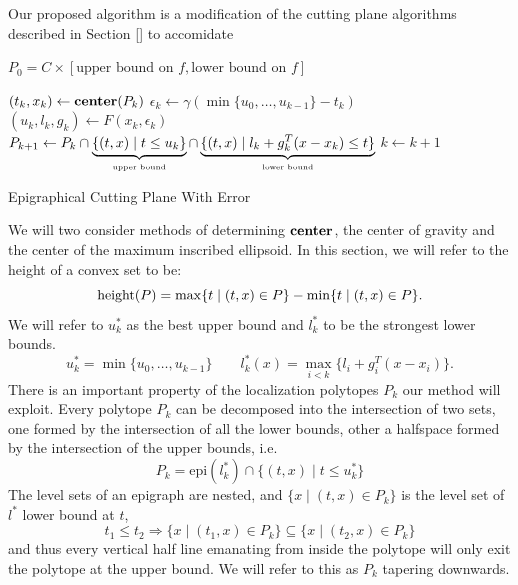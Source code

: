 Our proposed algorithm is a modification of the cutting plane algorithms
described in Section [] to accomidate
\begin{algorithm} 
  \SetAlgoNoLine
  \DontPrintSemicolon
  $P_0 = C \times {[\mbox{upper bound on $f$}, \mbox{lower bound on $f$}]}$\;
  
   {
  \nl $(t_k,x_k) \gets \mbox{\bf center}(P_k)$\;
  \nl $\epsilon_k \gets \gamma (\min \{ u_0, \dots, u_{k-1}\}-t_k )$\;
  \nl $(u_k,l_k,g_k)\gets F(x_k, \epsilon_k )$\;
  \nl $P_{k+1}\gets P_k\cap 
      \underbrace{\{(t,x)\mid t\leq u_k \}}_{\mbox{\tiny upper bound}} \cap 
      \underbrace{\{(t,x)\mid l_k+g_k^{T}(x-x_k)\leq t\}}_{\mbox{\tiny lower bound}}$\;
  \vspace{-5mm}
  \nl $k \gets k+1$  
  }
  \caption{Epigraphical Cutting Plane With Error \label{alg:cutting_plane_epi_err}}
\end{algorithm}
\noindent We will two consider methods of determining $\mbox{\bf center}$, the
center of gravity and the center of the maximum inscribed ellipsoid. In this
section, we will refer to the height of a convex set to be:
$$
\mbox{\rm height}(P)=\max\{t\mid(t,x)\in P\}-\min\{t\mid(t,x)\in P\}.
$$
We will refer to $u^*_k$ as the best upper bound and $l^*_k$ to be the strongest lower bounds.
\[
u^*_k = \min{ \{ u_0, \dots, u_{k-1}\} } \qquad l^*_k(x) = \max_{i < k}\{l_i + g_i^T(x-x_i)\}.
\]
There is an important property of the localization polytopes $P_k$ our method will exploit. Every polytope $P_k$ can be decomposed into the intersection of two sets,
one formed by the intersection of all the lower bounds, other a halfspace
formed by the intersection of the upper bounds, i.e.
$$
P_k = \mbox{epi}(l^*_k) \cap \{(t,x) \mid t \leq u^*_k\}
$$
The level sets of an epigraph are nested, and $\{x \mid (t,x) \in P_k\} $ is the level set of $l^*$ lower bound at $t$,
\[
t_1 \leq t_2 \Rightarrow \{x \mid (t_1,x) \in P_k\} \subseteq \{x \mid (t_2,x) \in P_k\}
\]
and thus every vertical half line emanating from inside the polytope will
only exit the polytope at the upper bound. We will refer to this as $P_k$ tapering downwards.



